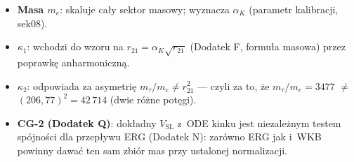 \begin{itemize}
  \item \textbf{Masa $m_e$}: skaluje cały sektor masowy;
        wyznacza $\alpha_K$ (parametr kalibracji, sek08).
  \item \textbf{$\kappa_1$}: wchodzi do wzoru na $r_{21} = \alpha_K\sqrt{r_{21}}$
        (Dodatek F, formuła masowa) przez poprawkę anharmoniczną.
  \item \textbf{$\kappa_2$}: odpowiada za asymetrię $m_\tau/m_e \neq r_{21}^2$
        --- czyli za to, że $m_\tau/m_e = 3477$ $\neq$ $(206{,}77)^2 = 42\,714$
        (dwie różne potęgi).
  \item \textbf{CG-2 (Dodatek Q)}: dokładny $V_\mathrm{SL}$ z~ODE kinku jest
        niezależnym testem spójności dla przepływu ERG (Dodatek N):
        zarówno ERG jak i~WKB powinny dawać ten sam zbiór mas przy
        ustalonej normalizacji.
\end{itemize}

\bigskip
\begin{center}
\end{center}
